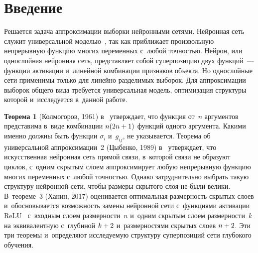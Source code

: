 
  
\vspace*{9pt}



\thispagestyle{headings}

\begin{multicols}{2}

\label{st\stat}



\section{Введение}

\vspace*{-3pt}

Решается задача аппроксимации выборки нейронными сетями.
Нейронная сеть служит универсальной моделью~\cite{sixth,third}, так как 
приближает произвольную непрерывную функцию многих \mbox{переменных} с~любой 
точностью. Нейрон, или однослойная нейронная сеть, представляет собой 
суперпозицию двух функций~--- функции активации и~линейной комбинации 
признаков объекта. Но однослойные сети применимы только для линейно 
разделимых выборок. Для аппроксимации выборок общего вида требуется 
универсальная модель, оптимизация структуры которой и~исследуется в~данной 
работе.

\smallskip

\noindent
\textbf{Теорема 1} (Колмогоров, 1961) в~\cite{twentythree} утверждает, что 
функция от~$n$ аргументов представима в~виде комбинации $n(2n \hm+ 1)$ 
функций одного аргумента. Какими именно должны быть функции 
$\sigma_i$ и~$g_{ij}$, не указывается.
Теорема об универсальной аппроксимации~2 (Цыбенко, 1989) в~\cite{twentythree} 
утверждает, что искусственная нейронная сеть прямой связи, в~которой связи не 
образуют циклов, с~одним скрытым слоем аппроксимирует любую непрерывную 
функцию многих переменных с~любой точностью.
Однако затруднительно выбрать такую структуру нейронной сети, чтобы размеры 
скрытого слоя не были велики. В~теореме~3 (Ханин, 2017) оценивается 
оптимальная размерность скрытых слоев и~обосновывается возможность замены 
нейронной сети с~функциями активации ReLU~\cite{twentythree} с~входным слоем 
раз\-мер\-ности~$n$ и~одним скрытым слоем раз\-мер\-ности~$k$ на эквивалентную 
с~глубиной $k\hm+2$ и~размерностями скрытых слоев $n \hm+ 2$. Эти три тео\-ре\-мы 
и~определяют исследуемую структуру суперпозиций сети глубокого обучения.


\end{multicols}
